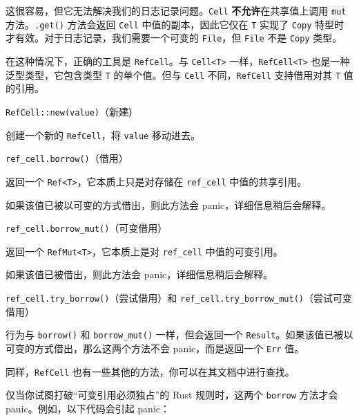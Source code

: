 这很容易，但它无法解决我们的日志记录问题。\texttt{Cell} \textbf{不允许}在共享值上调用 \texttt{mut} 方法。\texttt{.get()} 方法会返回 \texttt{Cell} 中值的副本，因此它仅在 \texttt{T} 实现了 \texttt{Copy} 特型时才有效。对于日志记录，我们需要一个可变的 \texttt{File}，但 \texttt{File} 不是 \texttt{Copy} 类型。

在这种情况下，正确的工具是 \texttt{RefCell}。与 \texttt{Cell<T>} 一样，\texttt{RefCell<T>} 也是一种泛型类型，它包含类型 \texttt{T} 的单个值。但与 \texttt{Cell} 不同，\texttt{RefCell} 支持借用对其 \texttt{T} 值的引用。

\begin{mySidenote}
\texttt{RefCell::new(value)}（新建）
\end{mySidenote}

创建一个新的 \texttt{RefCell}，将 \texttt{value} 移动进去。

\begin{mySidenote}
\texttt{ref\_cell.borrow()}（借用）
\end{mySidenote}

返回一个 \texttt{Ref<T>}，它本质上只是对存储在 \texttt{ref\_cell} 中值的共享引用。

如果该值已被以可变的方式借出，则此方法会 panic，详细信息稍后会解释。

\begin{myNote}
\texttt{ref\_cell.borrow\_mut()}（可变借用）
\end{myNote}

返回一个 \texttt{RefMut<T>}，它本质上是对 \texttt{ref\_cell} 中值的可变引用。

如果该值已被借出，则此方法会 panic，详细信息稍后会解释。

\begin{myNote}
\texttt{ref\_cell.try\_borrow()}（尝试借用）和 \texttt{ref\_cell.try\_borrow\_mut()}（尝试可变借用）
\end{myNote}

行为与 \texttt{borrow()} 和 \texttt{borrow\_mut()} 一样，但会返回一个 \texttt{Result}。如果该值已被以可变的方式借出，那么这两个方法不会 panic，而是返回一个 \texttt{Err} 值。

同样，\texttt{RefCell} 也有一些其他的方法，你可以在其文档中进行查找。

仅当你试图打破“可变引用必须独占”的 Rust 规则时，这两个 \texttt{borrow} 方法才会 panic。例如，以下代码会引起 panic：

